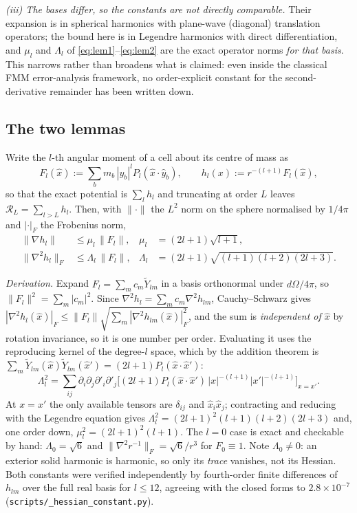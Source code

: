 \emph{(iii) The bases differ, so the constants are not directly comparable.} Their expansion is in
spherical harmonics with plane-wave (diagonal) translation operators; the bound here is in Legendre
harmonics with direct differentiation, and $\mu_l$ and $\Lambda_l$ of
\eqref{eq:lem1}--\eqref{eq:lem2} are the exact operator norms \emph{for that basis}. This narrows
rather than broadens what is claimed: even inside the classical FMM error-analysis framework, no
order-explicit constant for the second-derivative remainder has been written down.

\subsection{The two lemmas}

Write the $l$-th angular moment of a cell about its centre of mass as
\begin{equation}
F_l(\hat x):=\sum_b m_b\,|y_b|^l P_l(\hat x\cdot\hat y_b),
\qquad
h_l(x):=r^{-(l+1)}F_l(\hat x),
\end{equation}
so that the exact potential is $\sum_l h_l$ and truncating at order $L$ leaves
$\mathcal R_L=\sum_{l>L}h_l$. Then, with $\|\cdot\|$ the $L^2$ norm on the sphere normalised by
$1/4\pi$ and $|\cdot|_F$ the Frobenius norm,
\begin{align}
\big\|\nabla h_l\big\| &\le \mu_l\,\|F_l\|, &
\mu_l &= (2l+1)\sqrt{l+1},
\label{eq:lem1}\\
\big\|\nabla^2 h_l\big\|_F &\le \Lambda_l\,\|F_l\|, &
\Lambda_l &= (2l+1)\sqrt{(l+1)(l+2)(2l+3)} .
\label{eq:lem2}
\end{align}

\emph{Derivation.} Expand $F_l=\sum_m c_m\tilde Y_{lm}$ in a basis orthonormal under
$d\Omega/4\pi$, so $\|F_l\|^2=\sum_m|c_m|^2$. Since $\nabla^2h_l=\sum_m c_m\nabla^2 h_{lm}$, Cauchy--Schwarz
gives $|\nabla^2h_l(\hat x)|_F\le\|F_l\|\sqrt{\sum_m|\nabla^2h_{lm}(\hat x)|^2_F}$, and the sum is
\emph{independent of $\hat x$} by rotation invariance, so it is one number per order. Evaluating it
uses the reproducing kernel of the degree-$l$ space, which by the addition theorem is
$\sum_m\tilde Y_{lm}(\hat x)\tilde Y_{lm}(\hat x')=(2l+1)P_l(\hat x\cdot\hat x')$:
\begin{equation}
\Lambda_l^2=\sum_{ij}\partial_i\partial_j\partial'_{i}\partial'_{j}
\Big[(2l+1)P_l(\hat x\cdot\hat x')\,|x|^{-(l+1)}|x'|^{-(l+1)}\Big]_{x=x'} .
\end{equation}
At $x=x'$ the only available tensors are $\delta_{ij}$ and $\hat x_i\hat x_j$; contracting and
reducing with the Legendre equation gives $\Lambda_l^2=(2l+1)^2(l+1)(l+2)(2l+3)$ and, one order down,
$\mu_l^2=(2l+1)^2(l+1)$. The $l{=}0$ case is exact and checkable by hand: $\Lambda_0=\sqrt6$ and
$\|\nabla^2 r^{-1}\|_F=\sqrt6/r^3$ for $F_0\equiv1$. Note $\Lambda_0\ne0$: an exterior solid harmonic
is harmonic, so only its \emph{trace} vanishes, not its Hessian. Both constants were verified
independently by fourth-order finite differences of $h_{lm}$ over the full real basis for $l\le12$,
agreeing with the closed forms to $2.8\times10^{-7}$ (\texttt{scripts/\allowbreak \_\allowbreak hessian\_\allowbreak constant.\allowbreak py}).

